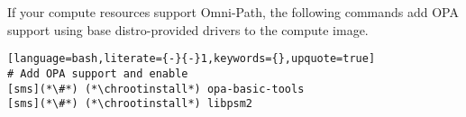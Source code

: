 If your compute resources support Omni-Path, the following commands add OPA
support using base distro-provided drivers to the compute image.

\begin{lstlisting}[language=bash,literate={-}{-}1,keywords={},upquote=true]
# Add OPA support and enable
[sms](*\#*) (*\chrootinstall*) opa-basic-tools
[sms](*\#*) (*\chrootinstall*) libpsm2
\end{lstlisting}
